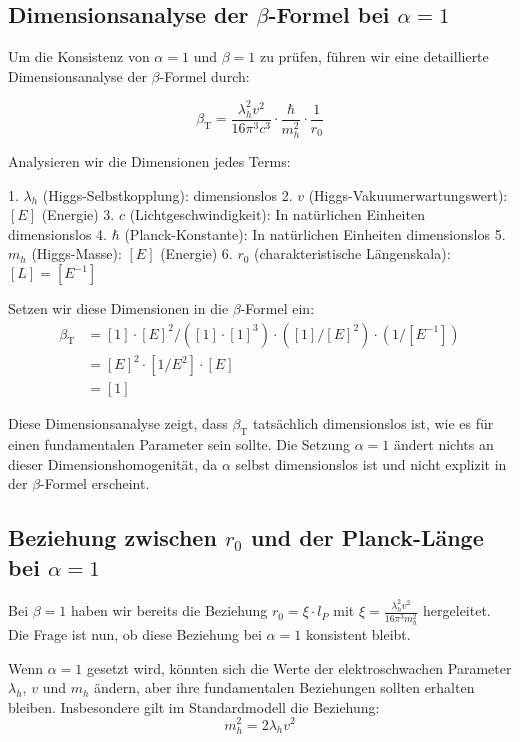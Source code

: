 \documentclass[12pt,a4paper]{article}
\newcommand{\betaT}{\beta_{\text{T}}}
\begin{document}
	\subsection{Dimensionsanalyse der \(\beta\)-Formel bei \(\alpha = 1\)}
	
	Um die Konsistenz von \(\alpha = 1\) und \(\beta = 1\) zu prüfen, führen wir eine detaillierte Dimensionsanalyse der \(\beta\)-Formel durch:
	
	\begin{equation}
		\betaT = \frac{\lambda_h^2 v^2}{16\pi^3 c^3} \cdot \frac{\hbar}{m_h^2} \cdot \frac{1}{r_0}
	\end{equation}
	
	Analysieren wir die Dimensionen jedes Terms:
	
	1. \(\lambda_h\) (Higgs-Selbstkopplung): dimensionslos
	2. \(v\) (Higgs-Vakuumerwartungswert): \([E]\) (Energie)
	3. \(c\) (Lichtgeschwindigkeit): In natürlichen Einheiten dimensionslos
	4. \(\hbar\) (Planck-Konstante): In natürlichen Einheiten dimensionslos
	5. \(m_h\) (Higgs-Masse): \([E]\) (Energie)
	6. \(r_0\) (charakteristische Längenskala): \([L] = [E^{-1}]\)
	
	Setzen wir diese Dimensionen in die \(\beta\)-Formel ein:
	\begin{align}
		\betaT &= [1] \cdot [E]^2 / ([1] \cdot [1]^3) \cdot ([1]/[E]^2) \cdot (1/[E^{-1}]) \\
		&= [E]^2 \cdot [1/E^2] \cdot [E] \\
		&= [1]
	\end{align}
	
	Diese Dimensionsanalyse zeigt, dass \(\betaT\) tatsächlich dimensionslos ist, wie es für einen fundamentalen Parameter sein sollte. Die Setzung \(\alpha = 1\) ändert nichts an dieser Dimensionshomogenität, da \(\alpha\) selbst dimensionslos ist und nicht explizit in der \(\beta\)-Formel erscheint.
	
	\subsection{Beziehung zwischen \(r_0\) und der Planck-Länge bei \(\alpha = 1\)}
	
	Bei \(\beta = 1\) haben wir bereits die Beziehung \(r_0 = \xi \cdot l_P\) mit \(\xi = \frac{\lambda_h^2 v^2}{16\pi^3 m_h^2}\) hergeleitet. Die Frage ist nun, ob diese Beziehung bei \(\alpha = 1\) konsistent bleibt.
	
	Wenn \(\alpha = 1\) gesetzt wird, könnten sich die Werte der elektroschwachen Parameter \(\lambda_h\), \(v\) und \(m_h\) ändern, aber ihre fundamentalen Beziehungen sollten erhalten bleiben. Insbesondere gilt im Standardmodell die Beziehung:
	\begin{equation}
		m_h^2 = 2\lambda_h v^2
	\end{equation}
	
\end{document}
